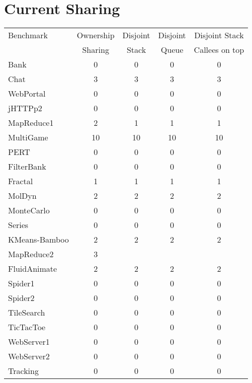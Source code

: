 \documentclass{amsart}[9pt]
\begin{document}
\section{Current Sharing}




\begin{tabular}{|l|c|c|c|c|}
\hline
Benchmark     & Ownership & Disjoint & Disjoint & Disjoint Stack \\
              & Sharing   & Stack    & Queue    & Callees on top \\
\hline
Bank          & 0         & 0  & 0  &  0          \\
Chat          & 3         & 3  & 3  &  3          \\
WebPortal     & 0         & 0  & 0  &  0          \\
jHTTPp2       & 0         & 0  & 0  &  0          \\
MapReduce1    & 2         & 1  & 1  &  1          \\
MultiGame     & 10        & 10 & 10 &  10         \\
PERT          & 0         & 0  & 0  &  0          \\
FilterBank    & 0         & 0  & 0  &  0          \\
Fractal       & 1         & 1  & 1  &  1          \\
MolDyn        & 2         & 2  & 2  &  2          \\
MonteCarlo    & 0         & 0  & 0  &  0          \\
Series        & 0         & 0  & 0  &  0          \\
KMeans-Bamboo & 2         & 2  & 2  &  2          \\
MapReduce2    & 3         & \color{red}{0}  & \color{red}{0}  &  \color{red}{0}          \\
FluidAnimate  & 2         & 2  & 2  &  2          \\
Spider1       & 0         & 0  & 0  &  0          \\
Spider2       & 0         & 0  & 0  &  0          \\
TileSearch    & 0         & 0  & 0  &  0          \\
TicTacToe     & 0         & 0  & 0  &  0          \\
WebServer1    & 0         & 0  & 0  &  0          \\
WebServer2    & 0         & 0  & 0  &  0          \\
Tracking      & 0         & 0  & 0  &  0          \\
\hline
\end{tabular}
\end{document}
